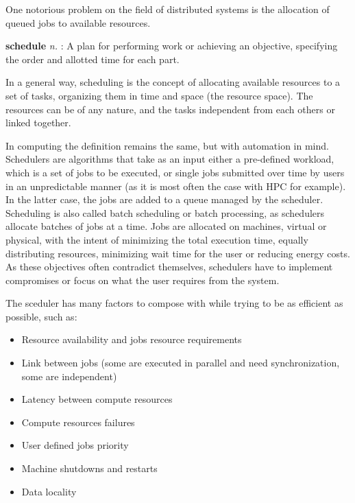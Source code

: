 
One notorious problem on the field of distributed systems is the allocation of
queued jobs to available resources.

\begin{displayquote}[][]
	\textbf{schedule} \textit{n.} : A plan for
	performing work or achieving an objective, specifying the order and
	allotted time for each part.
\end{displayquote}

In a general way, scheduling is the concept of allocating available resources
to a set of tasks, organizing them in time and space (the resource space). The
resources can be of any nature, and the tasks independent from each others or
linked together.

In computing the definition remains the same, but with automation in mind.
Schedulers are algorithms that take as an input either a pre-defined workload,
which is a set of jobs  to be executed, or single jobs submitted over time by
users in an unpredictable manner (as it is most often the case with HPC for
example). In the latter case, the jobs are added to a queue managed by the
scheduler. Scheduling is also called batch scheduling or batch processing, as
schedulers allocate batches of jobs at a time. Jobs are allocated on machines,
virtual or physical, with the intent of minimizing the total execution time,
equally distributing resources, minimizing wait time for the user or reducing
energy costs. As these objectives often contradict themselves, schedulers
have to implement compromises or focus on what the user requires from the
system.

The sceduler has many factors to compose with while trying to be as efficient
as possible, such as:

\begin{itemize}
	\item Resource availability and jobs resource requirements
	\item Link between jobs (some are executed in parallel and need synchronization, some are independent)
	\item Latency between compute resources
	\item Compute resources failures
	\item User defined jobs priority
	\item Machine shutdowns and restarts
	\item Data locality
\end{itemize}

